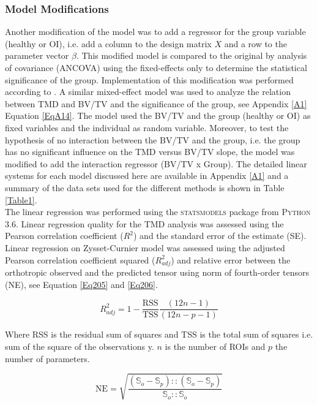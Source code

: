 \documentclass[a4paper,fleqn]{DC_ArtStyle}
\begin{document}
\subsubsection{Model Modifications}
Another modification of the model was to add a regressor for the group variable (healthy or OI), i.e. add a column to the design matrix $X$ and a row to the parameter vector $\beta$. This modified model is compared to the original by analysis of covariance (ANCOVA) using the fixed-effects only to determine the statistical significance of the group. Implementation of this modification was performed according to \cite{Fox2016}. A similar mixed-effect model was used to analyze the relation between TMD and BV/TV and the significance of the group, see Appendix \ref{A1} Equation \ref{EqA14}. The model used the BV/TV and the group (healthy or OI) as fixed variables and the individual as random variable. Moreover, to test the hypothesis of no interaction between the BV/TV and the group, i.e. the group has no significant influence on the TMD versus BV/TV slope, the model was modified to add the interaction regressor (BV/TV x Group). The detailed linear systems for each model discussed here are available in Appendix \ref{A1} and a summary of the data sets used for the different methods is shown in Table \ref{Table1}.\\

The linear regression was performed using the \textsc{statsmodels} package from \textsc{Python 3.6}. Linear regression quality for the TMD analysis was assessed using the Pearson correlation coefficient ($R^2$) and the standard error of the estimate (SE). Linear regression on Zysset-Curnier model was assessed using the adjusted Pearson correlation coefficient squared ($R^2_{adj}$) and relative error between the orthotropic observed and the predicted tensor using norm of fourth-order tensors (NE), see Equation \ref{Eq205} and \ref{Eq206}. 

\begin{equation}
	R^2_{adj} = 1 - \frac{\mathrm{RSS}}{\mathrm{TSS}} \frac{(12n-1)}{(12n - p - 1)}
	\label{Eq205}
\end{equation}

Where RSS is the residual sum of squares and TSS is the total sum of squares i.e. sum of the square of the observations y. $n$ is the number of ROIs and $p$ the number of parameters.

\begin{equation}
	\text{NE} = \sqrt{\frac{(\mathbb{S}_o - \mathbb{S}_p) :: (\mathbb{S}_o - \mathbb{S}_p)}{\mathbb{S}_o :: \mathbb{S}_o}}
	\label{Eq206}
\end{equation}
\end{document}
